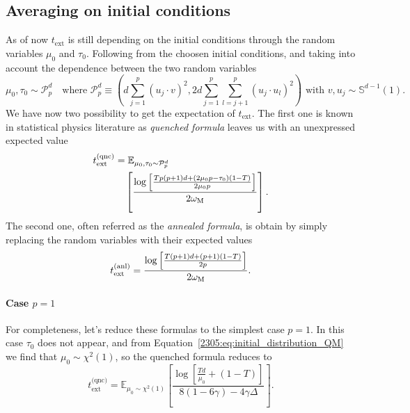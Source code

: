 \subsection{Averaging on initial conditions}
As of now \(t_\text{ext}\) is still  depending on the initial conditions through the random variables \(\mu_0\) and \(\tau_0\).
Following from the choosen initial conditions, and taking into account the dependence between the two random variables
\[
    \mu_0,\tau_0 \sim \mathcal{P}^d_p \quad\text{where }
    \mathcal{P}^d_p \equiv \left(d\sum_{j=1}^{p}(u_j\cdot v)^2, 2d\sum_{j=1}^{p}\sum_{l=j+1}^{p}(u_j\cdot u_l)^2\right)\text{ with } v,u_j\sim\mathbb S^{d-1}(1).
\]
We have now two possibility to get the expectation of \(t_\text{ext}\). The first one is known in statistical physics literature as \emph{quenched formula} leaves us with an unexpressed expected value
\begin{equation}\begin{split}
    t_\text{ext}^\text{(qnc)} &= \mathbb E_{\mu_0,\tau_0 \sim \mathcal{P}^d_p} \\
    &\quad\left[
        \frac{\log\left[\frac{Tp(p+1)d+(2\mu_0p-\tau_0)(1-T)}{2\mu_0 p}\right]}{2\omega_{\mathrm{M}}}
    \right].
\end{split}\end{equation}
The second one, often referred as the \emph{annealed formula}, is obtain by simply replacing the random variables with their expected values
\begin{equation}
    t_\text{ext}^\text{(anl)} = \frac{\log\left[\frac{T(p+1)d+(p+1)(1-T)}{2 p}\right]}{2\omega_{\mathrm{M}}}.
\end{equation}

\paragraph{Case \(p=1\)} For completeness, let's reduce these formulas to the simplest case \(p=1\).
In this case \(\tau_0\) does not appear, and from Equation~\eqref{2305:eq:initial_distribution_QM} we find that \(\mu_0 \sim \chi^2(1)\), so the quenched formula reduces to
\begin{equation}
    t_\text{ext}^\text{(qnc)} = \mathbb E_{\mu_0 \sim \chi^2(1)} \left[
        \frac{\log\left[\frac{Td}{\mu_0}+(1-T)\right]}{8(1-6\gamma)-4\gamma\Delta}
    \right].
\end{equation}


